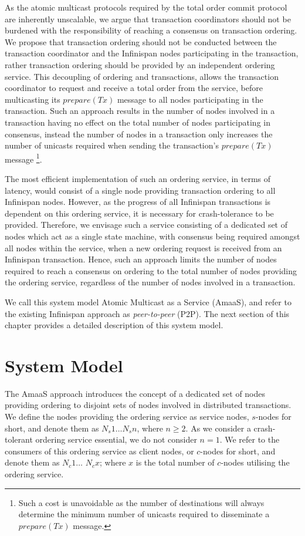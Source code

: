 As the atomic multicast protocols required by the total order commit protocol are inherently unscalable, we argue that transaction coordinators should not be burdened with the responsibility of reaching a consensus on transaction ordering.  We propose that transaction ordering should not be conducted between the transaction coordinator and the Infinispan nodes participating in the transaction, rather transaction ordering should be provided by an independent ordering service.  This decoupling of ordering and transactions, allows the transaction coordinator to request and receive a total order from the service, before multicasting its $prepare(Tx)$ message to all nodes participating in the transaction.  Such an approach results in the number of nodes involved in a transaction having no effect on the total number of nodes participating in consensus, instead the number of nodes in a transaction only increases the number of unicasts required when sending the transaction's $prepare(Tx)$ message \footnote{Such a cost is unavoidable as the number of destinations will always determine the minimum number of unicasts required to disseminate a $prepare(Tx)$ message.}.  

The most efficient implementation of such an ordering service, in terms of latency, would consist of a single node providing transaction ordering to all Infinispan nodes.  However, as the progress of all Infinispan transactions is dependent on this ordering service, it is necessary for crash-tolerance to be provided.  Therefore, we envisage such a service consisting of a dedicated set of nodes which act as a single state machine, with consensus being required amongst all nodes within the service, when a new ordering request is received from an Infinispan transaction.  Hence, such an approach limits the number of nodes required to reach a consensus on ordering to the total number of nodes providing the ordering service, regardless of the number of nodes involved in a transaction.  

We call this system model Atomic Multicast as a Service (\textsf{AmaaS}), and refer to the existing Infinispan approach as \emph{peer-to-peer} (P2P).  The next section of this chapter provides a detailed description of this system model.    	

\section{System Model}	
	The \textsf{AmaaS} approach introduces the concept of a dedicated set of nodes providing ordering to disjoint sets of nodes involved in distributed transactions.  We define the nodes providing the ordering service as service nodes, $s$-nodes for short, and denote them as $N_s1 \ldots N_sn$, where $n \geq 2$.  As we consider a crash-tolerant ordering service essential, we do not consider $n = 1$.  We refer to the consumers of this ordering service as client nodes, or $c$-nodes for short, and denote them as $N_c1 \ldots$ $N_cx$; where $x$ is the total number of $c$-nodes utilising the ordering service.  
		
